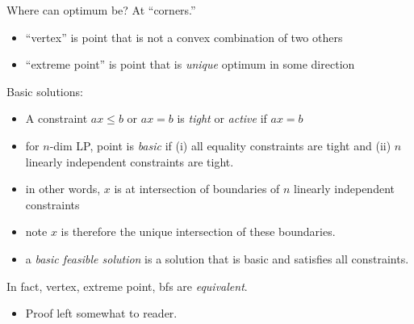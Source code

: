 \documentclass{article}
\begin{document}
Where can optimum be? At ``corners.''
\begin{itemize}
\item ``vertex'' is point that is not a convex combination of two
others
\item ``extreme point'' is point that is \emph{unique} optimum in some
direction 
\end{itemize}

Basic solutions:
\begin{itemize}
\item A constraint $ax \le b$ or $ax=b$ is {\em tight} or {\em active}
  if $ax=b$ 
\item for $n$-dim LP, point is {\em basic} if (i) all equality
  constraints are tight and (ii) $n$ linearly independent constraints
  are tight.
\item in other words, $x$ is at intersection of boundaries of $n$
  linearly independent constraints
\item note $x$ is therefore the unique intersection of these
  boundaries.
\item a {\em basic feasible solution} is a solution that is basic and
  satisfies all constraints.
\end{itemize}

In fact, vertex, extreme point, bfs are \emph{equivalent}.
\begin{itemize}
\item Proof left somewhat to reader.
\end{itemize}
\end{document}
